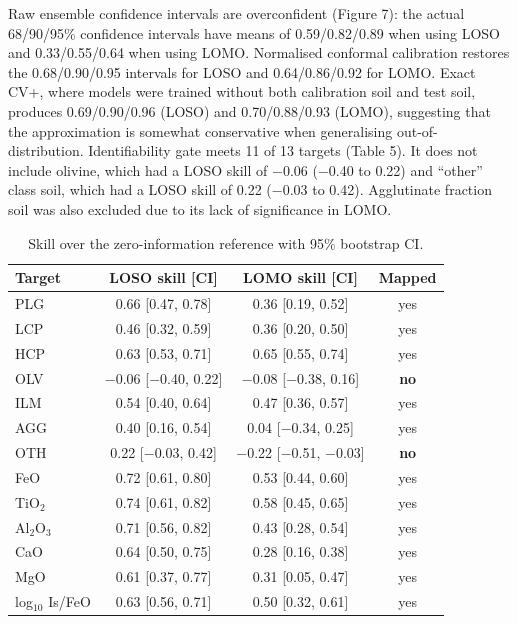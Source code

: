 \documentclass[remotesensing,article,submit,pdftex,moreauthors]{Definitions/mdpi}
\begin{document}
Raw ensemble confidence intervals are overconfident (Figure 7): the actual 68/90/95\% confidence intervals have means of 0.59/0.82/0.89 when using LOSO and 0.33/0.55/0.64 when using LOMO. Normalised conformal calibration restores the 0.68/0.90/0.95 intervals for LOSO and 0.64/0.86/0.92 for LOMO. Exact CV+, where models were trained without both calibration soil and test soil, produces 0.69/0.90/0.96 (LOSO) and 0.70/0.88/0.93 (LOMO), suggesting that the approximation is somewhat conservative when generalising out-of-distribution. Identifiability gate meets 11 of 13 targets (Table 5). It does not include olivine, which had a LOSO skill of $-$0.06 ($-$0.40 to 0.22) and ``other'' class soil, which had a LOSO skill of 0.22 ($-$0.03 to 0.42). Agglutinate fraction soil was also excluded due to its lack of significance in LOMO.

\begin{table}[H]
\caption{Skill over the zero-information reference with 95\% bootstrap CI.\label{tab5}}
\small
\begin{tabularx}{\textwidth}{LCCC}
\toprule
\textbf{Target} & \textbf{LOSO skill [CI]} & \textbf{LOMO skill [CI]} & \textbf{Mapped} \\
\midrule
PLG & 0.66 [0.47, 0.78] & 0.36 [0.19, 0.52] & yes \\
LCP & 0.46 [0.32, 0.59] & 0.36 [0.20, 0.50] & yes \\
HCP & 0.63 [0.53, 0.71] & 0.65 [0.55, 0.74] & yes \\
OLV & $-$0.06 [$-$0.40, 0.22] & $-$0.08 [$-$0.38, 0.16] & \textbf{no} \\
ILM & 0.54 [0.40, 0.64] & 0.47 [0.36, 0.57] & yes \\
AGG & 0.40 [0.16, 0.54] & 0.04 [$-$0.34, 0.25] & yes \\
OTH & 0.22 [$-$0.03, 0.42] & $-$0.22 [$-$0.51, $-$0.03] & \textbf{no} \\
FeO & 0.72 [0.61, 0.80] & 0.53 [0.44, 0.60] & yes \\
TiO$_{2}$ & 0.74 [0.61, 0.82] & 0.58 [0.45, 0.65] & yes \\
Al$_{2}$O$_{3}$ & 0.71 [0.56, 0.82] & 0.43 [0.28, 0.54] & yes \\
CaO & 0.64 [0.50, 0.75] & 0.28 [0.16, 0.38] & yes \\
MgO & 0.61 [0.37, 0.77] & 0.31 [0.05, 0.47] & yes \\
log$_{10}$ Is/FeO & 0.63 [0.56, 0.71] & 0.50 [0.32, 0.61] & yes \\
\bottomrule
\end{tabularx}
\end{table}
\end{document}
